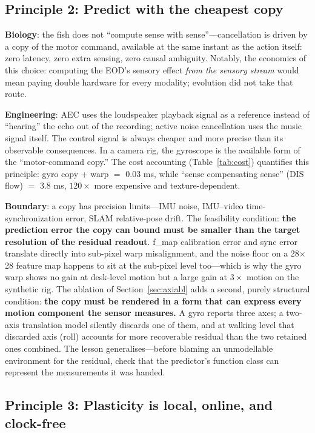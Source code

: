 \documentclass[12pt,a4paper]{article}
\begin{document}
\subsection{Principle 2: Predict with the cheapest copy}

\textbf{Biology}: the fish does not ``compute sense with sense''---cancellation is driven by a copy of the motor command, available at the same instant as the action itself: zero latency, zero extra sensing, zero causal ambiguity. Notably, the economics of this choice: computing the EOD's sensory effect \emph{from the sensory stream} would mean paying double hardware for every modality; evolution did not take that route.

\textbf{Engineering}: AEC uses the loudspeaker playback signal as a reference instead of ``hearing'' the echo out of the recording; active noise cancellation uses the music signal itself. The control signal is always cheaper and more precise than its observable consequences. In a camera rig, the gyroscope is the available form of the ``motor-command copy.'' The cost accounting (Table~\ref{tab:cost}) quantifies this principle: gyro copy + warp $=$ 0.03 ms, while ``sense compensating sense'' (DIS flow) $=$ 3.8 ms, $120\times$ more expensive and texture-dependent.

\textbf{Boundary}: a copy has precision limits---IMU noise, IMU--video time-synchronization error, SLAM relative-pose drift. The feasibility condition: \textbf{the prediction error the copy can bound must be smaller than the target resolution of the residual readout}. f\_map calibration error and sync error translate directly into sub-pixel warp misalignment, and the noise floor on a 28$\times$28 feature map happens to sit at the sub-pixel level too---which is why the gyro warp shows no gain at desk-level motion but a large gain at $3\times$ motion on the synthetic rig. The ablation of Section~\ref{sec:axiabl} adds a second, purely structural condition: \textbf{the copy must be rendered in a form that can express every motion component the sensor measures.} A gyro reports three axes; a two-axis translation model silently discards one of them, and at walking level that discarded axis (roll) accounts for more recoverable residual than the two retained ones combined. The lesson generalises---before blaming an unmodellable environment for the residual, check that the predictor's function class can represent the measurements it was handed.

\subsection{Principle 3: Plasticity is local, online, and clock-free}
\end{document}
